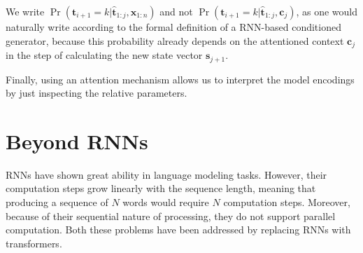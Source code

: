 \begin{note}{}
We write $\Pr(\mathbf{t}_{i+1}=k|\hat{\mathbf{t}}_{1:j},\mathbf{x}_{1:n})$ and not $\Pr(\mathbf{t}_{i+1}=k|\hat{\mathbf{t}}_{1:j},\mathbf{c}_{j})$, as one would naturally write according to the formal definition of a RNN-based conditioned generator, because this probability already depends on the attentioned context $\mathbf{c}_j$ in the step of calculating the new state vector $\mathbf{s}_{j+1}$.
\end{note}

Finally, using an attention mechanism allows us to interpret the model encodings by just inspecting the relative parameters.

\section{Beyond RNNs}
RNNs have shown great ability in language modeling tasks.
However, their computation steps grow linearly with the sequence length, meaning that producing a sequence of \(N\) words would require \(N\) computation steps.
Moreover, because of their sequential nature of processing, they do not support parallel computation.
Both these problems have been addressed by replacing RNNs with transformers.
